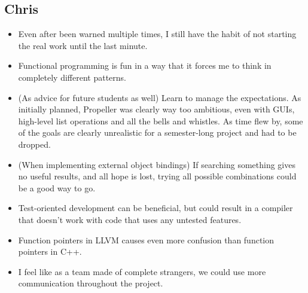 \subsection{Chris}
\begin{itemize}
\item Even after been warned multiple times, I still have the habit of not starting the real work
until the last minute.
\item Functional programming is fun in a way that it forces me to think in completely different
patterns.
\item (As advice for future students as well) Learn to manage the expectations. As initially
planned, Propeller was clearly way too ambitious, even with GUIs, high-level list operations and
all the bells and whistles. As time flew by, some of the goals are clearly unrealistic for a
semester-long project and had to be dropped.
\item (When implementing external object bindings) If searching something gives no useful results,
and all hope is lost, trying all possible combinations could be a good way to go.
\item Test-oriented development can be beneficial, but could result in a compiler that doesn't work
with code that uses any untested features.
\item Function pointers in LLVM causes even more confusion than function pointers in C++.
\item I feel like as a team made of complete strangers, we could use more communication throughout
the project.
\end{itemize}
